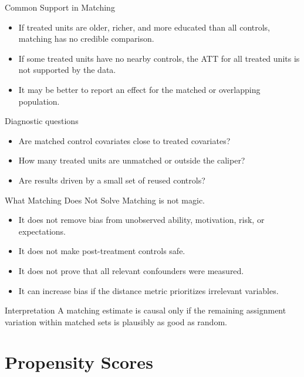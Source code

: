 \documentclass[11pt,aspectratio=169]{beamer}
\begin{document}
\begin{frame}{Common Support in Matching}
  \small
  \begin{itemize}
    \item If treated units are older, richer, and more educated than all controls, matching has no credible comparison.
    \item If some treated units have no nearby controls, the ATT for all treated units is not supported by the data.
    \item It may be better to report an effect for the matched or overlapping population.
  \end{itemize}
  \begin{block}{Diagnostic questions}
    \begin{itemize}
      \item Are matched control covariates close to treated covariates?
      \item How many treated units are unmatched or outside the caliper?
      \item Are results driven by a small set of reused controls?
    \end{itemize}
  \end{block}
\end{frame}

\begin{frame}{What Matching Does Not Solve}
  Matching is not magic.
  \begin{itemize}
    \item It does not remove bias from unobserved ability, motivation, risk, or expectations.
    \item It does not make post-treatment controls safe.
    \item It does not prove that all relevant confounders were measured.
    \item It can increase bias if the distance metric prioritizes irrelevant variables.
  \end{itemize}
  \begin{block}{Interpretation}
    A matching estimate is causal only if the remaining assignment variation within matched sets is plausibly as good as random.
  \end{block}
\end{frame}

\section{Propensity Scores}
\end{document}
